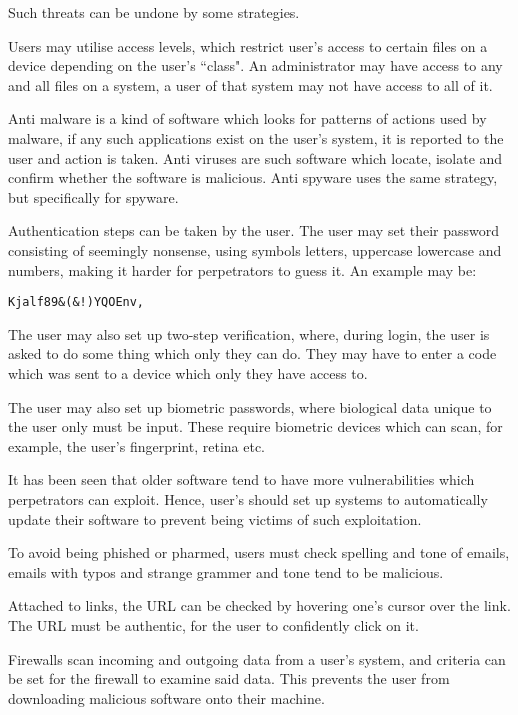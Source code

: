 Such threats can be undone by some strategies. 

Users may utilise access levels, which restrict user's access to certain files on a device 
depending on the user's ``class". An administrator may have access to any and all files on a 
system, a user of that system may not have access to all of it.

Anti malware is a kind of software which looks for patterns of actions used by malware, if any
such applications exist on the user's system, it is reported to the user and action is taken. Anti 
viruses are such software which locate, isolate and confirm whether the software is malicious. Anti
spyware uses the same strategy, but specifically for spyware.

Authentication steps can be taken by the user. The user may set their password consisting of 
seemingly nonsense, using symbols letters, uppercase lowercase and numbers, making it harder
for perpetrators to guess it. An example may be:
\begin{center}
\begin{BVerbatim}
Kjalf89&(&!)YQOEnv,
\end{BVerbatim}
\end{center}
The user may also set up two-step verification, where, during login, the user is asked to do some
thing which only they can do. They may have to enter a code which was sent to a device which only
they have access to.

The user may also set up biometric passwords, where biological data unique to the user only
must be input. These require biometric devices which can scan, for example, the user's fingerprint,
retina etc.

It has been seen that older software tend to have more vulnerabilities which perpetrators can
exploit. Hence, user's should set up systems to automatically update their software to prevent
being victims of such exploitation.

To avoid being phished or pharmed, users must check spelling and tone of emails, emails with
typos and strange grammer and tone tend to be malicious.

Attached to links, the URL can be checked by hovering one's cursor over the link. The URL must
be authentic, for the user to confidently click on it.

Firewalls scan incoming and outgoing data from a user's system, and criteria can be set for the 
firewall to examine said data. This prevents the user from downloading malicious software onto
their machine.

